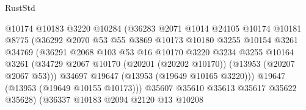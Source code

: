 \begin{lexlean}{RustStd}
\begin{coremodule}
                                    @10174
                                    @10183
                                    @3220
                                    @10284
                                    (@36283
                                      @2071
                                      @1014
                                      @24105
                                      @10174
                                      @10181
                                      @8775
                                      (@36292
                                        @2070
                                        @53
                                        @55
                                        @3869
                                        @10173
                                        @10180
                                        @3255
                                        @10154
                                        @3261
                                        @34769
                                        (@36291
                                          @2068
                                          @103
                                          @53
                                          @16
                                          @10170
                                          @3220
                                          @3234
                                          @3255
                                          @10164
                                          @3261
                                          (@34729
                                            @2067
                                            @10170
                                            (@20201 (@20202 @10170))
                                            (@13953 (@20207 @2067 @53)))
                                          @34697
                                          @19647
                                          (@13953 (@19649 @10165 @3220)))
                                        @19647
                                        (@13953 (@19649 @10155 @10173)))
                                      @35607
                                      @35610
                                      @35613
                                      @35617
                                      @35622
                                      @35628)
                                    (@36337
                                      @10183
                                      @2094
                                      @2120
                                      @13
                                      @10208

\end{coremodule}
\end{lexlean}
